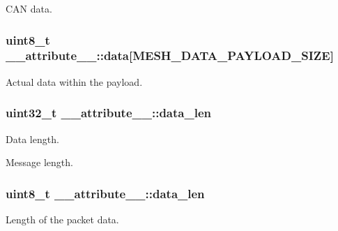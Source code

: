 C\+AN data. 

\subsubsection[{\texorpdfstring{data}{data}}]{\setlength{\rightskip}{0pt plus 5cm}uint8\+\_\+t \+\_\+\+\_\+attribute\+\_\+\+\_\+\+::data\mbox{[}{\bf M\+E\+S\+H\+\_\+\+D\+A\+T\+A\+\_\+\+P\+A\+Y\+L\+O\+A\+D\+\_\+\+S\+I\+ZE}\mbox{]}}\hypertarget{struct____attribute_____a0bb6bcfb06a69a501d1dfd0a0f1b1222}{}\label{struct____attribute_____a0bb6bcfb06a69a501d1dfd0a0f1b1222}


Actual data within the payload. 

\subsubsection[{\texorpdfstring{data\+\_\+len}{data_len}}]{\setlength{\rightskip}{0pt plus 5cm}uint32\+\_\+t \+\_\+\+\_\+attribute\+\_\+\+\_\+\+::data\+\_\+len}\hypertarget{struct____attribute_____ae6f628b8af2722362b91666d5cff6041}{}\label{struct____attribute_____ae6f628b8af2722362b91666d5cff6041}


Data length. 

Message length. 
\subsubsection[{\texorpdfstring{data\+\_\+len}{data_len}}]{\setlength{\rightskip}{0pt plus 5cm}uint8\+\_\+t \+\_\+\+\_\+attribute\+\_\+\+\_\+\+::data\+\_\+len}\hypertarget{struct____attribute_____a963d3c197770f024e680a0d0a774c99e}{}\label{struct____attribute_____a963d3c197770f024e680a0d0a774c99e}


Length of the packet data. 


